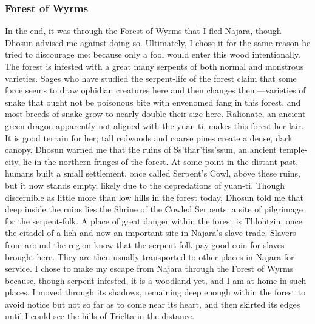 \documentclass[10pt,a4paper,twoside,twocolumn,openany,bg=print,nodeprecatedcode]{dndbook}
\begin{document}
\subsubsection{Forest of Wyrms}
In the end, it was through the Forest of Wyrms that I fled Najara, though Dhosun advised me against doing so. Ultimately, I chose it for the same reason he tried to discourage me: because only a fool would enter this wood intentionally. The forest is infested with a great many serpents of both normal and monstrous varieties.
Sages who have studied the serpent-life of the forest claim that some force seems to draw ophidian creatures here and then changes them—varieties of snake that ought not be poisonous bite with envenomed fang in this forest, and most breeds of snake grow to nearly double their size here. Ralionate, an ancient green dragon apparently not aligned with the yuan-ti, makes this forest her lair. It is good terrain for her; tall redwoods and coarse pines create a dense, dark canopy.
Dhosun warned me that the ruins of Ss'thar'tiss'ssun, an ancient temple-city, lie in the northern fringes of the forest. At some point in the distant past, humans built a small settlement, once called Serpent's Cowl, above these ruins, but it now stands empty, likely due to the depredations of yuan-ti. Though discernible as little more than low hills in the forest today, Dhosun told me that deep inside the ruins lies the Shrine of the Cowled Serpents, a site of pilgrimage for the serpent-folk.
A place of great danger within the forest is Thlohtzin, once the citadel of a lich and now an important site in Najara's slave trade. Slavers from around the region know that the serpent-folk pay good coin for slaves brought here. They are then usually transported to other places in Najara for service.
I chose to make my escape from Najara through the Forest of Wyrms because, though serpent-infested, it is a woodland yet, and I am at home in such places. I moved through its shadows, remaining deep enough within the forest to avoid notice but not so far as to come near its heart, and then skirted its edges until I could see the hills of Trielta in the distance.
\end{document}

